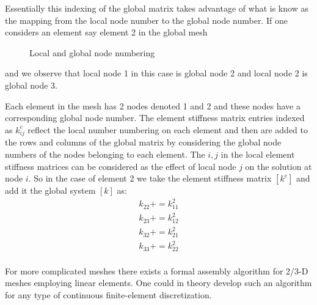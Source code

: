 Essentially this indexing of the global matrix takes advantage of what is know as the mapping from the local node number to the global node number.  If one considers an element say element 2 in the global mesh
\begin{figure}[h!]
\centering
{}
\caption{Local and global node numbering }
\label{fig:c2_local_global_num}
\end{figure}
and we observe that local node 1 in this case is global node 2 and local node 2 is global node 3.  

Each element in the mesh has 2 nodes denoted 1 and 2 and these nodes have a corresponding global node number.  The element stiffness matrix entries indexed as $k^{e}_{ij}$ reflect the local number numbering on each element and then are added to the rows and columns of the global matrix by considering the global node numbers of the nodes belonging to each element.  The $i,j$ in the local element stiffness matrices can be considered as the effect of local node $j$ on the solution at node $i$.  So in the case of element 2 we take the element stiffness matrix $\left[k^{e}\right]$ and add it the global system $\left[k \right]$ as: 
\begin{equation}
 \begin{split} 
 k_{22} += k^{2}_{11} \\
 k_{23} += k^{2}_{12} \\
 k_{32} += k^{2}_{21} \\
 k_{33} += k^{2}_{22} \\
 \end{split}
 \end{equation}
 
For more complicated meshes there exists a formal assembly algorithm for 2/3-D meshes employing linear elements.  One could in theory develop such an algorithm for any type of continuous finite-element discretization.  
